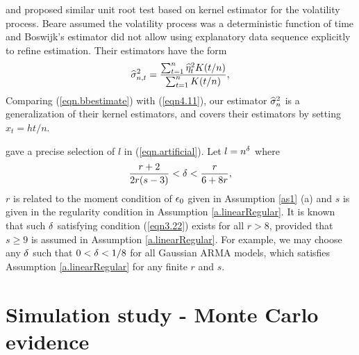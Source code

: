 \begin{rem}
\cite{beare2008} and \cite{boswijk2005} proposed similar unit root test based on kernel estimator for the volatility process. Beare assumed the volatility process was a deterministic function of time and Boswijk's estimator did not allow using explanatory data sequence explicitly to refine estimation. Their estimators have the form
\begin{equation}\la{eqn.bbestimate}
\widehat{\si}_{n,t}^2 = \frac{\sum_{t=1}^n \widehat{\eta}_{t}^2 K (t/n) }{\sum_{t=1}^n K(t/n)},
\end{equation}
Comparing (\ref{eqn.bbestimate}) with (\ref{eqn4.11}), our estimator $\widehat{\sigma}^2_n$ is a generalization of their kernel estimators, and  covers their estimators by setting $x_{t} =h t/n$.
\end{rem}


\begin{rem}
\cite{changparkphillips2001} gave a precise selection of $l$ in (\ref{eqn.artificial}). Let  $l = n^\delta$ where
\begin{equation}
\frac{r + 2}{2r (s - 3)} < \de < \frac{r}{6 + 8r}, \la{eqn3.22}
\end{equation}
$r$ is related to the moment condition of $\epsilon_0$ given in Assumption \ref{as1} (a) and $s$ is given in the regularity condition in Assumption \ref{a.linearRegular}. It is known that such $\delta$ satisfying condition (\ref{eqn3.22}) exists for all $r > 8$, provided that $s \ge 9$ is assumed in Assumption \ref{a.linearRegular}. For example, we may choose any $\delta$ such that $0 < \delta < 1/8$ for all Gaussian ARMA models, which satisfies Assumption \ref{a.linearRegular} for any finite $r$ and $s$.
\end{rem}



\section{Simulation study - Monte Carlo evidence} 



